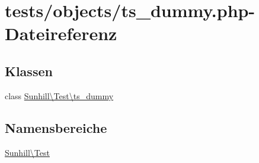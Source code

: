 \hypertarget{ts__dummy_8php}{}\section{tests/objects/ts\+\_\+dummy.php-\/\+Dateireferenz}
\label{ts__dummy_8php}
\subsection*{Klassen}
\begin{DoxyCompactItemize}
\item 
class \hyperlink{classSunhill_1_1Test_1_1ts__dummy}{Sunhill\textbackslash{}\+Test\textbackslash{}ts\+\_\+dummy}
\end{DoxyCompactItemize}
\subsection*{Namensbereiche}
\begin{DoxyCompactItemize}
\item 
 \hyperlink{namespaceSunhill_1_1Test}{Sunhill\textbackslash{}\+Test}
\end{DoxyCompactItemize}
